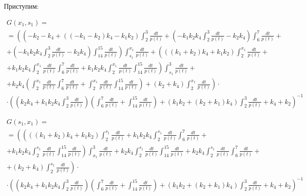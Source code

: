 \documentclass[a4paper,12pt]{article} %
\begin{document}
Приступим:

\begin{multline}
	G(x_1,s_1)=\\=
	\left(
		\left(
			-k_2-k_4+\left( \left( -k_1-k_2\right)  k_4-k_1 k_2\right)  \int_{2}^{3}\frac{dt}{p(t)}+\left( -k_1 k_2 k_4 \int_{2}^{3}\frac{dt}{p(t)}-k_2 k_4\right)  \int_{6}^{7}\frac{dt}{p(t)}
			\right. \right. + \\ + \left. \left.
			\left( -k_1 k_2 k_4 \int_{2}^{3}\frac{dt}{p(t)}-k_2 k_4\right)  \int_{14}^{15}\frac{dt}{p(t)}
		\right)
		\int_{s_1}^{x_1}\frac{dt}{p(t)}+\left( \left( \left( k_1+k_2\right)  k_4+k_1 k_2\right)  \int_{2}^{x_1}\frac{dt}{p(t)}
		\right. \right. + \\ + \left. \left.
		k_1 k_2 k_4 \int_{2}^{x_1}\frac{dt}{p(t)} \int_{6}^{7}\frac{dt}{p(t)}+k_1 k_2 k_4 \int_{2}^{x_1}\frac{dt}{p(t)} \int_{14}^{15}\frac{dt}{p(t)}\right)  \int_{s_1}^{3}\frac{dt}{p(t)}
		\right. + \\ + \left.
		k_2 k_4 \left( \int_{2}^{x_1}\frac{dt}{p(t)} \int_{6}^{7}\frac{dt}{p(t)}+\int_{2}^{x_1}\frac{dt}{p(t)} \int_{14}^{15}\frac{dt}{p(t)}\right) +\left( k_2+k_4\right)  \int_{2}^{x_1}\frac{dt}{p(t)}
	\right) \cdot \\ \cdot \left(
		\left( k_2 k_4+k_1 k_2 k_4 \int_{2}^{3}\frac{dt}{p(t)}\right)
		\left( \int_{6}^{7}\frac{dt}{p(t)}+ \int_{14}^{15}\frac{dt}{p(t)} \right)+
		\left( k_1 k_2+\left( k_2+k_1\right)  k_4\right)  \int_{2}^{3}\frac{dt}{p(t)}+k_4+k_2
	\right)^{-1}
\end{multline}


\begin{multline}
	G(s_1,x_1)=\\=
	\left(
		\left( \left( \left( k_1+k_2\right)  k_4+k_1 k_2\right)  \int_{2}^{s_1}\frac{dt}{p(t)}
		+%
		k_1 k_2 k_4 \int_{2}^{s_1}\frac{dt}{p(t)} \int_{6}^{7}\frac{dt}{p(t)}
		\right. \right. + \\ + \left. \left.
		k_1 k_2 k_4 \int_{2}^{s_1}\frac{dt}{p(t)} \int_{14}^{15}\frac{dt}{p(t)}\right)  \int_{x_1}^{3}\frac{dt}{p(t)}+k_2 k_4 \int_{2}^{s_1}\frac{dt}{p(t)} \int_{14}^{15}\frac{dt}{p(t)}+k_2 k_4 \int_{2}^{s_1}\frac{dt}{p(t)} \int_{6}^{7}\frac{dt}{p(t)}
		\right. + \\ + \left.
		\left( k_2+k_4\right)  \int_{2}^{s_1}\frac{dt}{p(t)}
	\right) \cdot \\ \cdot \left(
		\left( k_2 k_4+k_1 k_2 k_4 \int_{2}^{3}\frac{dt}{p(t)}\right)
		\left( \int_{6}^{7}\frac{dt}{p(t)}+ \int_{14}^{15}\frac{dt}{p(t)} \right)+
		\left( k_1 k_2+\left( k_2+k_1\right)  k_4\right)  \int_{2}^{3}\frac{dt}{p(t)}+k_4+k_2
	\right)^{-1}
\end{multline}
\end{document}
